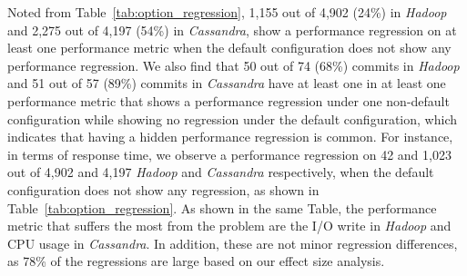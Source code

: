 Noted from Table~\ref{tab:option_regression}, 1,155 out of 4,902 (24\%) \instance in \emph{Hadoop} and 2,275 out of 4,197 (54\%) \instance in \emph{Cassandra}, show a performance regression on at least one performance metric when the default configuration does not show any performance regression. %
We also find that 50 out of 74 (68\%) commits in \emph{Hadoop} and 51 out of 57 (89\%) commits in \emph{Cassandra} have at least one \instance in at least one performance metric that shows a performance regression under one non-default configuration while showing no regression under the default configuration, %
which indicates that having a hidden performance regression is common. %
For instance, in terms of response time, we observe a performance regression on 42 and 1,023 out of 4,902 and 4,197 \emph{Hadoop} and \emph{Cassandra} \instance %
respectively, when the default configuration does not show any regression, as shown in Table~\ref{tab:option_regression}. As shown in the same Table, the performance metric that suffers the most from the \inconsistent problem %
are the I/O write  in \emph{Hadoop} and CPU usage in \emph{Cassandra}. %
In addition, these are not minor regression differences, as 78\% of the regressions are large based on our effect size analysis. 


